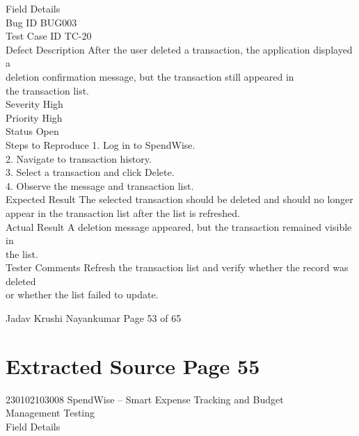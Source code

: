 \documentclass[12pt,a4paper]{report}
\begin{document}
\smallskip
Field                 Details\\ 
Bug ID                BUG003\\ 
Test Case ID          TC-20\\ 
Defect Description    After the user deleted a transaction, the application displayed a\\ 
deletion confirmation message, but the transaction still appeared in\\ 
the transaction list.\\ 
Severity              High\\ 
Priority              High\\ 
Status                Open\\ 
Steps to Reproduce    1. Log in to SpendWise.\\ 
2. Navigate to transaction history.\\ 
3. Select a transaction and click Delete.\\ 
4. Observe the message and transaction list.\\ 
Expected Result       The selected transaction should be deleted and should no longer\\ 
appear in the transaction list after the list is refreshed.\\ 
Actual Result         A deletion message appeared, but the transaction remained visible in\\ 
the list.\\ 
Tester Comments       Refresh the transaction list and verify whether the record was deleted\\ 
or whether the list failed to update.\\ 

\smallskip

\smallskip

\smallskip
Jadav Krushi Nayankumar                                                               Page 53 of 65\\ 

\clearpage
\section*{Extracted Source Page 55}
230102103008                          SpendWise – Smart Expense Tracking and Budget\\ 
Management Testing\\ 

\smallskip
Field                 Details\\ 
\end{document}
